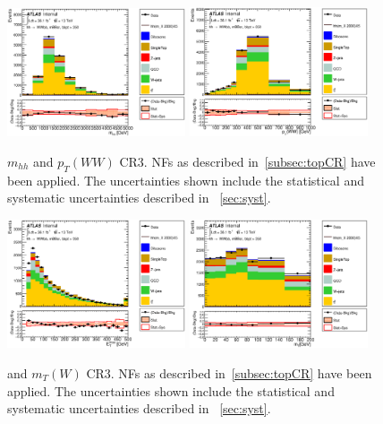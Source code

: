\begin{figure}[!h]
\begin{center}
\includegraphics*[width=0.47\textwidth] {figures/ControlPlots/reOpt2000/C_mBBcr_reOpt2000_bbpt350_hhMass_regionA_met25d020.eps}
\includegraphics*[width=0.47\textwidth] {figures/ControlPlots/reOpt2000/C_mBBcr_reOpt2000_bbpt350_WWPt_regionA_met25d020.eps}
\caption[$m_{hh}$ and  $p_{T}(WW)$ CR3.]{$m_{hh}$ and  $p_{T}(WW)$ CR3.  \ttbar NFs as described in~\ref{subsec:topCR} have been applied. The uncertainties shown include the statistical and systematic uncertainties described in ~\ref{sec:syst}.}
\end{center}
\end{figure}

\begin{figure}[!h]
\begin{center}
\includegraphics*[width=0.47\textwidth] {figures/ControlPlots/reOpt2000/C_mBBcr_reOpt2000_bbpt350_MET_regionA_met25d020}
\includegraphics*[width=0.47\textwidth] {figures/ControlPlots/reOpt2000/C_mBBcr_reOpt2000_bbpt350_wlepmtben_regionA_met25d020.eps}
\caption[\met and  $m_{T}(W)$ CR3.]{\met and  $m_{T}(W)$ CR3.  \ttbar NFs as described in~\ref{subsec:topCR} have been applied. The uncertainties shown include the statistical and systematic uncertainties described in ~\ref{sec:syst}.}
\end{center}
\end{figure}

